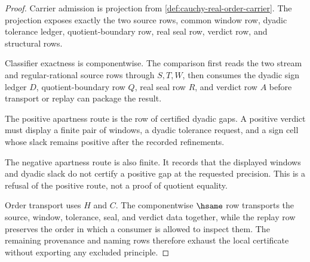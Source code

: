 \begin{proof}
Carrier admission is projection from \autoref{def:cauchy-real-order-carrier}. The projection exposes exactly the two source rows, common window row, dyadic tolerance ledger, quotient-boundary row, real seal row, verdict row, and structural rows.

Classifier exactness is componentwise. The comparison first reads the two stream and regular-rational source rows through $S,T,W$, then consumes the dyadic sign ledger $D$, quotient-boundary row $Q$, real seal row $R$, and verdict row $A$ before transport or replay can package the result.

The positive apartness route is the row of certified dyadic gaps. A positive verdict must display a finite pair of windows, a dyadic tolerance request, and a sign cell whose slack remains positive after the recorded refinements.

The negative apartness route is also finite. It records that the displayed windows and dyadic slack do not certify a positive gap at the requested precision. This is a refusal of the positive route, not a proof of quotient equality.

Order transport uses $H$ and $C$. The componentwise $\hsame$ row transports the source, window, tolerance, seal, and verdict data together, while the replay row preserves the order in which a consumer is allowed to inspect them. The remaining provenance and naming rows therefore exhaust the local certificate without exporting any excluded principle.
\end{proof}

